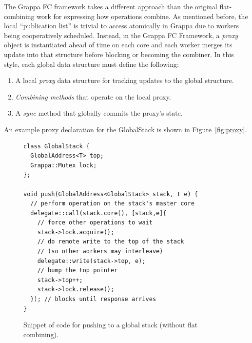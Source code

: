 The Grappa FC framework takes a different approach than the original flat-combining work for expressing how operations combine. As mentioned before, the local ``publication list'' is trivial to access atomically in Grappa due to workers being cooperatively scheduled.
Instead, in the Grappa FC Framework, a \emph{proxy} object is instantiated ahead of time on each core and each worker merges its update into that structure before blocking or becoming the combiner.
In this style, each global data structure must define the following:
\begin{enumerate}
  \item A local \emph{proxy} data structure for tracking updates to the global structure.
  \item \emph{Combining methods} that operate on the local proxy.
  \item A \emph{sync} method that globally commits the proxy's state.
\end{enumerate}
An example proxy declaration for the GlobalStack is shown in Figure~\ref{fig:proxy}.

\begin{figure}[t]
\centering
\begin{lstlisting}[style=grappa]
class GlobalStack {
  GlobalAddress<T> top;
  Grappa::Mutex lock;
};

void push(GlobalAddress<GlobalStack> stack, T e) {
  // perform operation on the stack's master core
  delegate::call(stack.core(), [stack,e]{
    // force other operations to wait
    stack->lock.acquire();
    // do remote write to the top of the stack
    // (so other workers may interleave)
    delegate::write(stack->top, e);
    // bump the top pointer
    stack->top++;
    stack->lock.release();
  }); // blocks until response arrives
}\end{lstlisting}
\caption{Snippet of code for pushing to a global stack (without flat combining).}
\label{fig:push}
\end{figure}


